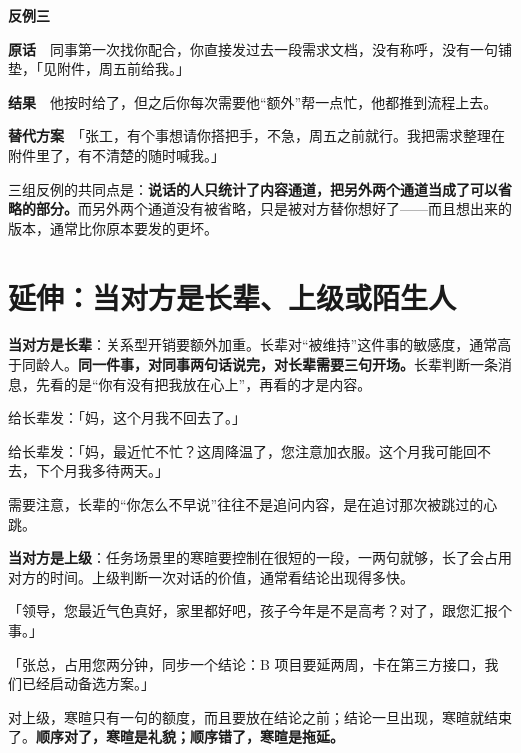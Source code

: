\begin{mdquote}
\textbf{反例三}\par
\vspace{0.3\baselineskip}
\textbf{原话}　同事第一次找你配合，你直接发过去一段需求文档，没有称呼，没有一句铺垫，「见附件，周五前给我。」\par
\textbf{结果}　他按时给了，但之后你每次需要他“额外”帮一点忙，他都推到流程上去。\par
\textbf{替代方案}　「张工，有个事想请你搭把手，不急，周五之前就行。我把需求整理在附件里了，有不清楚的随时喊我。」
\end{mdquote}

三组反例的共同点是：\textbf{说话的人只统计了内容通道，把另外两个通道当成了可以省略的部分。}而另外两个通道没有被省略，只是被对方替你想好了——而且想出来的版本，通常比你原本要发的更坏。

\section{延伸：当对方是长辈、上级或陌生人}

\textbf{当对方是长辈}：关系型开销要额外加重。长辈对“被维持”这件事的敏感度，通常高于同龄人。\textbf{同一件事，对同事两句话说完，对长辈需要三句开场。}长辈判断一条消息，先看的是“你有没有把我放在心上”，再看的才是内容。

\begin{mdquote}
给长辈发：「妈，这个月我不回去了。」\par
{}给长辈发：「妈，最近忙不忙？这周降温了，您注意加衣服。这个月我可能回不去，下个月我多待两天。」
\end{mdquote}

需要注意，长辈的“你怎么不早说”往往不是追问内容，是在追讨那次被跳过的心跳。

\textbf{当对方是上级}：任务场景里的寒暄要控制在很短的一段，一两句就够，长了会占用对方的时间。上级判断一次对话的价值，通常看结论出现得多快。

\begin{mdquote}
「领导，您最近气色真好，家里都好吧，孩子今年是不是高考？对了，跟您汇报个事。」\par
{}「张总，占用您两分钟，同步一个结论：B 项目要延两周，卡在第三方接口，我们已经启动备选方案。」
\end{mdquote}

对上级，寒暄只有一句的额度，而且要放在结论之前；结论一旦出现，寒暄就结束了。\textbf{顺序对了，寒暄是礼貌；顺序错了，寒暄是拖延。}

